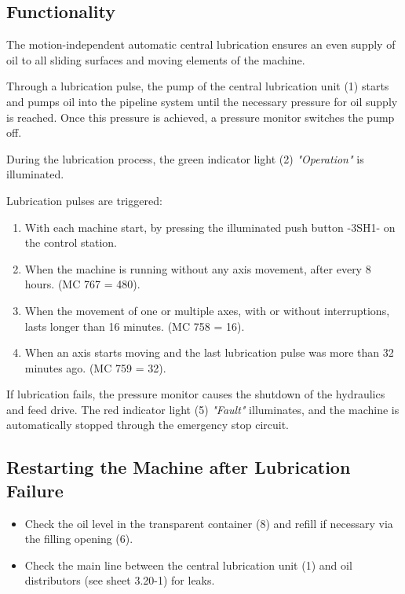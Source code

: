 \subsection*{Functionality}

The motion-independent automatic central lubrication ensures an even supply of oil to all sliding surfaces and moving elements of the machine.

\vspace{.3cm}

\noindent Through a lubrication pulse, the pump of the central lubrication unit (1) starts and pumps oil into the pipeline system until the necessary pressure for oil supply is reached. Once this pressure is achieved, a pressure monitor switches the pump off.

\vspace{.3cm}

\noindent During the lubrication process, the green indicator light (2) \textit{"Operation"} is illuminated.

\vspace{.3cm}

\noindent Lubrication pulses are triggered:

\begin{enumerate}
    \item With each machine start, by pressing the illuminated push button -3SH1- on the control station.\footnotemark
    \item When the machine is running without any axis movement, after every 8 hours. (MC 767 = 480).
    \item When the movement of one or multiple axes, with or without interruptions, lasts longer than 16 minutes. (MC 758 = 16).
    \item When an axis starts moving and the last lubrication pulse was more than 32 minutes ago. (MC 759 = 32).
\end{enumerate}

\noindent If lubrication fails, the pressure monitor causes the shutdown of the hydraulics and feed drive. The red indicator light (5) \textit{"Fault"} illuminates, and the machine is automatically stopped through the emergency stop circuit.

\subsection*{Restarting the Machine after Lubrication Failure}

\begin{itemize}
    \item Check the oil level in the transparent container (8) and refill if necessary via the filling opening (6).\footnotemark
    \item Check the main line between the central lubrication unit (1) and oil distributors (see sheet 3.20-1) for leaks.
\end{itemize}

